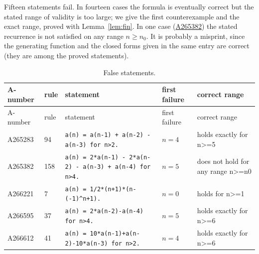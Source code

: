 \documentclass[11pt]{article}
\theoremstyle{definition}
\theoremstyle{remark}
\newcommand{\oeis}[1]{\href{https://oeis.org/#1}{#1}}
\begin{document}
Fifteen statements fail. In fourteen cases the formula is eventually correct but the stated range of validity is too large; we give the first counterexample and the exact range, proved with Lemma~\ref{lem:fin}. In one case (\oeis{A265382}) the stated recurrence is not satisfied on any range $n\ge n_0$. It is probably a misprint, since the generating function and the closed forms given in the same entry are correct (they are among the proved statements).

\begin{longtable}{p{1.4cm}p{0.8cm}p{6.3cm}p{1.4cm}p{4cm}}
\caption{False statements.}\label{tab:false}\\
\toprule A-number & rule & statement & first failure & correct range\\\midrule\endfirsthead
\toprule A-number & rule & statement & first failure & correct range\\\midrule\endhead
A265283 & 94 & \texttt{a(n)\allowbreak{} \allowbreak{}=\allowbreak{} \allowbreak{}a(n-\allowbreak{}1)\allowbreak{} \allowbreak{}+\allowbreak{} \allowbreak{}a(n-\allowbreak{}2)\allowbreak{} \allowbreak{}-\allowbreak{} \allowbreak{}a(n-\allowbreak{}3)\allowbreak{} \allowbreak{}for \allowbreak{}n>2.} & $n=4$ & holds exactly for n>=5 \\
A265382 & 158 & \texttt{a(n)\allowbreak{} \allowbreak{}=\allowbreak{} \allowbreak{}2*\allowbreak{}a(n-\allowbreak{}1)\allowbreak{} \allowbreak{}-\allowbreak{} \allowbreak{}2*\allowbreak{}a(n-\allowbreak{}2)\allowbreak{} \allowbreak{}-\allowbreak{} \allowbreak{}a(n-\allowbreak{}3)\allowbreak{} \allowbreak{}+\allowbreak{} \allowbreak{}a(n-\allowbreak{}4)\allowbreak{} \allowbreak{}for \allowbreak{}n>4.} & $n=5$ & does not hold for any range n>=n0 \\
A266221 & 7 & \texttt{a(n)\allowbreak{} \allowbreak{}=\allowbreak{} \allowbreak{}1/\allowbreak{}2*\allowbreak{}(n+\allowbreak{}1)\allowbreak{}*\allowbreak{}(n-\allowbreak{}(-\allowbreak{}1)\allowbreak{}\^{}n+\allowbreak{}1)\allowbreak{}.} & $n=0$ & holds for n>=1 \\
A266595 & 37 & \texttt{a(n)\allowbreak{} \allowbreak{}=\allowbreak{} \allowbreak{}2*\allowbreak{}a(n-\allowbreak{}2)\allowbreak{}-\allowbreak{}a(n-\allowbreak{}4)\allowbreak{} \allowbreak{}for \allowbreak{}n>4.} & $n=5$ & holds exactly for n>=6 \\
A266612 & 41 & \texttt{a(n)\allowbreak{} \allowbreak{}=\allowbreak{} \allowbreak{}10*\allowbreak{}a(n-\allowbreak{}1)\allowbreak{}+\allowbreak{}a(n-\allowbreak{}2)\allowbreak{}-\allowbreak{}10*\allowbreak{}a(n-\allowbreak{}3)\allowbreak{} \allowbreak{}for \allowbreak{}n>2.} & $n=4$ & holds exactly for n>=6 \\

\end{longtable}
\end{document}
